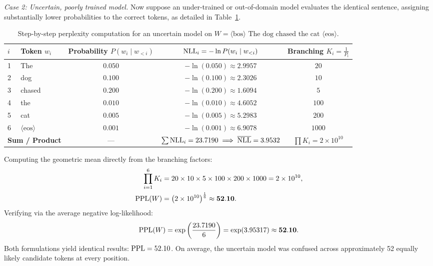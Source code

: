 \documentclass[../../main.tex]{subfiles}
\begin{document}
\textit{Case 2: Uncertain, poorly trained model.}
Now suppose an under-trained or out-of-domain model evaluates the identical sentence, assigning substantially lower probabilities to the correct tokens, as detailed in Table~\ref{tab:perplexity_uncertain_example}.

\begin{table}[htbp]
\centering
\small
\caption{Step-by-step perplexity computation for an uncertain model on $W = \langle\text{bos}\rangle \text{ The dog chased the cat } \langle\text{eos}\rangle$.}
\label{tab:perplexity_uncertain_example}
\begin{tabular}{llccc}
\toprule
$i$ & Token $w_i$ & Probability $P(w_i \mid w_{<i})$ & $\mathrm{NLL}_i = -\ln P(w_i \mid w_{<i})$ & Branching $K_i = \frac{1}{P_i}$ \\
\midrule
1 & The & $0.050$ & $-\ln(0.050) \approx 2.9957$ & $20$ \\
2 & dog & $0.100$ & $-\ln(0.100) \approx 2.3026$ & $10$ \\
3 & chased & $0.200$ & $-\ln(0.200) \approx 1.6094$ & $5$ \\
4 & the & $0.010$ & $-\ln(0.010) \approx 4.6052$ & $100$ \\
5 & cat & $0.005$ & $-\ln(0.005) \approx 5.2983$ & $200$ \\
6 & $\langle\text{eos}\rangle$ & $0.001$ & $-\ln(0.001) \approx 6.9078$ & $1000$ \\
\midrule
\multicolumn{2}{l}{\textbf{Sum / Product}} & --- & $\sum \mathrm{NLL}_i = 23.7190 \implies \overline{\mathrm{NLL}} = 3.9532$ & $\prod K_i = 2 \times 10^{10}$ \\
\bottomrule
\end{tabular}
\end{table}

Computing the geometric mean directly from the branching factors:
\begin{align}
\prod_{i=1}^6 K_i &= 20 \times 10 \times 5 \times 100 \times 200 \times 1000 = 2 \times 10^{10}, \\
\mathrm{PPL}(W) &= \left( 2 \times 10^{10} \right)^{\frac{1}{6}} \approx \mathbf{52.10}.
\end{align}
Verifying via the average negative log-likelihood:
\begin{equation}
\mathrm{PPL}(W) = \exp\left( \frac{23.7190}{6} \right) = \exp(3.95317) \approx \mathbf{52.10}.
\end{equation}
Both formulations yield identical results: $\mathrm{PPL} = 52.10$. On average, the uncertain model was confused across approximately 52 equally likely candidate tokens at every position.
\end{document}
